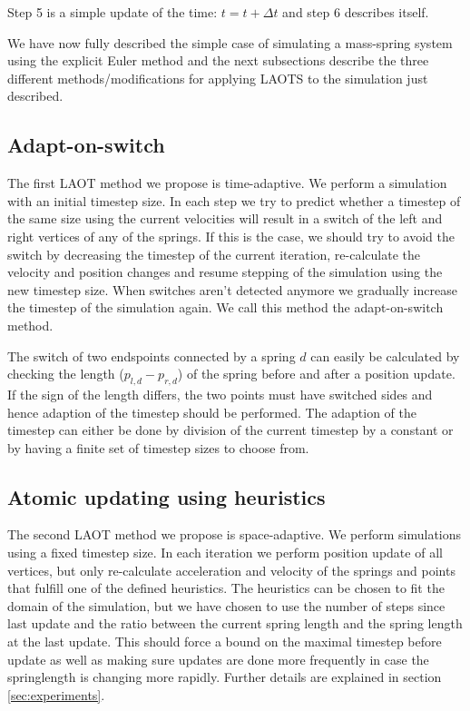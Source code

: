 \documentclass[twoside]{article}
\begin{document}
\begin{multicols}{2}
Step 5 is a simple update of the time: $t = t + \Delta t$ and step 6 describes
itself.

We have now fully described the simple case of simulating a mass-spring system
using the explicit Euler method and the next subsections describe the three
different methods/modifications for applying LAOTS to the simulation just
described.

\subsection{Adapt-on-switch}
The first LAOT method we propose is time-adaptive. We perform a simulation
with an initial timestep size. In each step we try to predict whether a timestep
of the same size using the current velocities will result in a switch of the
left and right vertices of any of the springs. If this is the case, we should
try to avoid the switch by decreasing the timestep of the current iteration,
re-calculate the velocity and position changes and resume stepping of the
simulation using the new timestep size. When switches aren't detected anymore
we gradually increase the timestep of the simulation again. We call this
method the adapt-on-switch method.

The switch of two endspoints connected by a spring $d$ can easily be
calculated by checking the length ($p_{l,d} - p_{r,d}$) of the spring before
and after a position update. If the sign of the length differs, the two
points must have switched sides and hence adaption of the timestep should be
performed. The adaption of the timestep can either be done by division of the
current timestep by a constant or by having a finite set of timestep sizes to
choose from.

\subsection{Atomic updating using heuristics}
The second LAOT method we propose is space-adaptive. We perform simulations
using a fixed timestep size. In each iteration we perform position update of
all vertices, but only re-calculate acceleration and velocity of the springs
and points that fulfill one of the defined heuristics. The heuristics can be
chosen to fit the domain of the simulation, but we have chosen to use the
number of steps since last update and the ratio between the current spring
length and the spring length at the last update. This should force a bound on
the maximal timestep before update as well as making sure updates are done
more frequently in case the springlength is changing more rapidly. Further
details are explained in section \ref{sec:experiments}.


\end{multicols}
\end{document}
